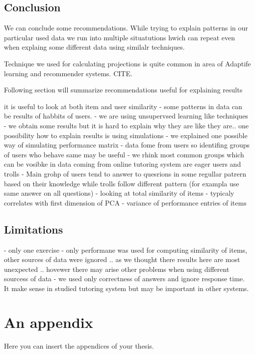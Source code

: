 \documentclass[
  digital, %
  table,   %
  nolof,     %
  nolot,     %
  nocover
]{fithesis3}
\begin{document}
\section{Conclusion}\label{conclusion}


We can conclude some recommendations. While trying to explain patterns
in our particular used data we run into multiple situatutions hwich can
repeat even when explaing some different data using similalr techniques.

Technique we used for calculating projections is quite common in area of
Adaptife learning and recommender systems. CITE.


Following section will summarize recommendations useful for explaining
results

it is useful to look at both item and user similarity - some
patterns in data can be results of habbits of users. - we are using
unsupervsed learning like techniques - we obtain some results but it is
hard to explain why they are like they are.. one possibility how to
explain results is using simulations - we explained one possible way of
simulating performance matrix - data fome from users so identifing
groups of users who behave same may be useful - we rhink most common
groups which can be vosibke in data coming from online tutoring system
are eager users and trolls - Main grohp of users tend to answer to
quesrions in some regullar patrern based on their knowledge while trolls
follow different pattern (for exampla use same answer on all questions)
- looking at total similarity of items - typicaly correlates with first
dimension of PCA - variance of performance entries of items



\section{Limitations}\label{limitations}

- only one exercise
- only performane was used for computing similarity of items, other sources of data were ignored .. as we thought there results here are most unexpected .. hovewer there may arise other problems when using different sourcess of data
- we used only correctness of answers and ignore response time. It make sense in studied tutoring system but may be important in other systems.


  \makeatletter\thesis@blocks@clear\makeatother
  \printindex

\appendix %
\chapter{An appendix}
Here you can insert the appendices of your thesis.
\end{document}
